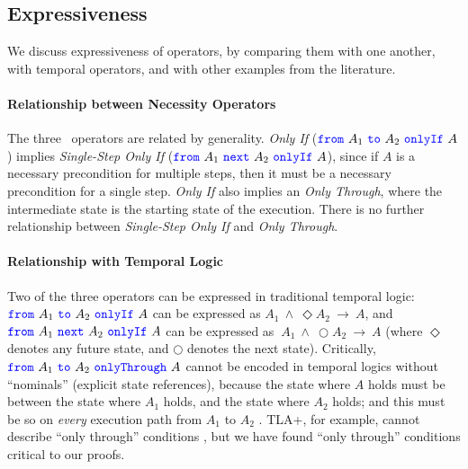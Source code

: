 \subsection{Expressiveness}

We discuss expressiveness of \Nec operators, by comparing 
them with one another, with temporal operators, and with other examples from the literature.

\paragraph{Relationship between Necessity Operators}
The three \Nec \ operators
are related by generality. 
 \emph{Only If} (${\color{blue}\texttt{from}}\ A_1\ {\color{blue}\texttt{to}}\ A_2\ {\color{blue}\texttt{onlyIf}}\ A$) implies
  \emph{Single-Step Only If} (${\color{blue}\texttt{from}}\ A_1\ {\color{blue}\texttt{next}}\ A_2\ {\color{blue}\texttt{onlyIf}}\ A$), since if $A$ is 
a necessary precondition for multiple steps, then it must be a necessary 
precondition for a single step. 
 \emph{Only If} also implies 
an \emph{Only Through}, where the intermediate state is the starting state
of the execution.  There is no further relationship between 
\emph{Single-Step Only If} and \emph{Only Through}.


\paragraph{Relationship with Temporal Logic}
Two of the three \Nec operators can be expressed in traditional
  temporal logic: 
  ${{\color{blue}\texttt{from}}\ A_1\ {\color{blue}\texttt{to}}\ A_2\ {\color{blue}\texttt{onlyIf}}\ A}$
can be expressed  %
 as 
 $A_1\ \wedge\ \Diamond A_2\ \longrightarrow\ A$, and
 ${\color{blue}\texttt{from}}\ A_1\ {\color{blue}\texttt{next}}\ A_2\ {\color{blue}\texttt{onlyIf}}\ A$
can be expressed  %
 as $\ A_1\ \wedge\ \bigcirc A_2\ \longrightarrow\ A$
 (where $\Diamond$ denotes any future state,  and
 $\bigcirc$ denotes the next state).
 Critically, 
${\color{blue}\texttt{from}}\ A_1\ {\color{blue}\texttt{to}}\ A_2\ {\color{blue}\texttt{onlyThrough}}\ A$ cannot be encoded in temporal logics
  without ``nominals'' (explicit state references), because the state where $A$ 
 holds must be between the state where $A_1$ holds, and the state
 where $A_2$ holds; and this must be so on \emph{every} execution path
 from $A_1$ to  $A_2$ \cite{hybridLogic2021,nominal-seplogic2020}.
 TLA+, for example, cannot describe ``only through'' conditions
 \cite{tlabook}, but we have found ``only through'' conditions critical
 to our proofs. 


\label{s:expressiveness}

